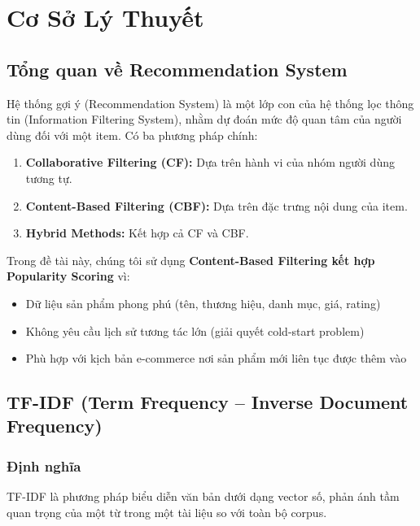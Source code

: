 \documentclass[12pt,a4paper]{report}
\begin{document}
\chapter{Cơ Sở Lý Thuyết}

\section{Tổng quan về Recommendation System}

Hệ thống gợi ý (Recommendation System) là một lớp con của hệ thống lọc thông tin (Information Filtering System), nhằm dự đoán mức độ quan tâm của người dùng đối với một item. Có ba phương pháp chính:

\begin{enumerate}
    \item \textbf{Collaborative Filtering (CF):} Dựa trên hành vi của nhóm người dùng tương tự.
    \item \textbf{Content-Based Filtering (CBF):} Dựa trên đặc trưng nội dung của item.
    \item \textbf{Hybrid Methods:} Kết hợp cả CF và CBF.
\end{enumerate}

Trong đề tài này, chúng tôi sử dụng \textbf{Content-Based Filtering kết hợp Popularity Scoring} vì:
\begin{itemize}
    \item Dữ liệu sản phẩm phong phú (tên, thương hiệu, danh mục, giá, rating)
    \item Không yêu cầu lịch sử tương tác lớn (giải quyết cold-start problem)
    \item Phù hợp với kịch bản e-commerce nơi sản phẩm mới liên tục được thêm vào
\end{itemize}

\section{TF-IDF (Term Frequency -- Inverse Document Frequency)}

\subsection{Định nghĩa}

TF-IDF là phương pháp biểu diễn văn bản dưới dạng vector số, phản ánh tầm quan trọng của một từ trong một tài liệu so với toàn bộ corpus.
\end{document}
